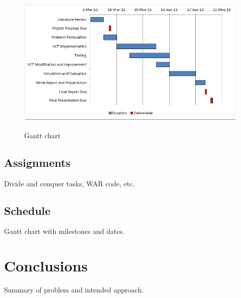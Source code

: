 \documentclass[a4paper,11pt]{article}
\begin{document}
%
\begin{figure}[tbp]
  \centering
  \includegraphics[width=0.95\columnwidth]{gantt_chart}
  \label{fig:gantt}
  \caption{Gantt chart}
\end{figure}

\subsection{Assignments}\label{sec:assignments}
Divide and conquer tasks, WAR code, etc.

\subsection{Schedule}\label{sec:schedule}
Gantt chart with milestones and dates.

%
\section{Conclusions}\label{sec:conclusions}
Summary of problem and intended approach.




\end{document}
